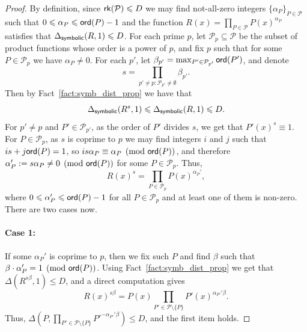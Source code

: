 \documentclass[11pt]{article}
\renewcommand\leq{\leqslant}
\begin{document}
    \begin{proof}
        By definition, since ${\sf rk}(\mathcal{P})\leq D$ we may find not-all-zero integers $\{\alpha_P\}_{P\in\mathcal{P}}$ such that $0\leq \alpha_{P}\leq {\sf ord}(P)-1$ and the function $R(x) = \prod\limits_{P\in\mathcal{P}}P(x)^{\alpha_P}$ satisfies that $\Delta_{{\sf symbolic}}(R,1)\leq D$. For each prime $p$, let $\mathcal{P}_{p}\subseteq \mathcal{P}$ be the subset of product functions whose order is a power of $p$, and fix $p$ such that for some $P\in \mathcal{P}_{p}$ we have $\alpha_P\neq 0$. 
        For each $p'$, let $\beta_{p'} = \max_{P'\in\mathcal{P}_{p'}}{\sf ord}(P')$, and denote 
        \[
        s = \prod\limits_{p'\neq p: \mathcal{P}_{p'}\neq \emptyset} \beta_{p'}.
        \]
        Then by Fact~\ref{fact:symb_dist_prop} we have that
        \[
        \Delta_{{\sf symbolic}}(R^s,1)\leq 
        \Delta_{{\sf symbolic}}(R,1)
        \leq D.
        \]
        For $p'\neq p$ and $P'\in \mathcal{P}_{p'}$, as the order of $P'$ divides $s$, we get that $P'(x)^{s}\equiv 1$. For  $P\in \mathcal{P}_p$, as $s$ is coprime to $p$ we may find integers $i$ and $j$ such that $is + j{\sf ord}(P) = 1$, so
        $is\alpha_P \equiv \alpha_P\pmod{{\sf ord}(P)}$, and therefore $\alpha_P':=s\alpha_P\neq 0\pmod{{\sf ord}(P)}$ for some $P\in \mathcal{P}_{p}$.
        Thus,
        \[
        R(x)^s = 
        \prod\limits_{P\in\mathcal{P}_p}P(x)^{\alpha_P'},
        \]
        where $0\leq \alpha_{P}'\leq {\sf ord}(P)-1$ for all $P\in\mathcal{P}_p$ and at least one of them is non-zero.
        There are two cases now. 
        \vspace{-2ex}
        \paragraph{Case 1: } If some $\alpha_P'$ is coprime to $p$, then we fix such $P$ and find $\beta$ such that $\beta\cdot  \alpha_P' = 1\pmod{{\sf ord}(P)}$. Using Fact~\ref{fact:symb_dist_prop} we get that 
        $\Delta(R^{s\beta},1)\leq D$, and a direct computation gives 
        \[
        R(x)^{s\beta}
        = P(x)\prod\limits_{P'\in\mathcal{P}\setminus\{P\}} P'(x)^{\alpha_{P'}' \beta}.
        \]
        Thus, $\Delta(P,\prod\limits_{P'\in\mathcal{P}\setminus\{P\}} P'^{-\alpha_{P'}'\beta})\leq D$, and the first item holds. 
        \vspace{-2ex}

\end{proof}
\end{document}
